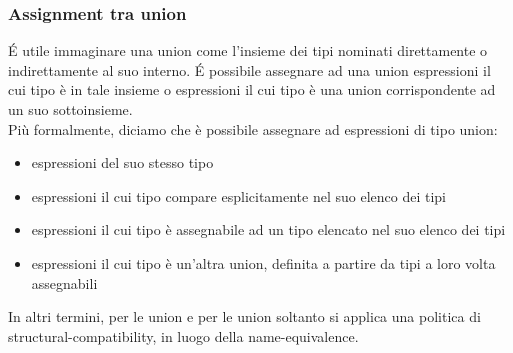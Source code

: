 \subsubsection{Assignment tra union}
É utile immaginare una union come l'insieme dei tipi nominati direttamente
o indirettamente al suo interno. É possibile assegnare ad una union espressioni il cui tipo è
in tale insieme o espressioni il cui tipo è una union corrispondente ad un suo sottoinsieme. \\

Più formalmente, diciamo che è possibile assegnare ad espressioni di tipo union:
\begin{itemize}
    \item espressioni del suo stesso tipo
    \item espressioni il cui tipo compare esplicitamente nel suo elenco dei tipi
    \item espressioni il cui tipo è assegnabile ad un tipo elencato nel suo elenco dei tipi
    \item espressioni il cui tipo è un’altra union, definita a partire da tipi a loro volta assegnabili
\end{itemize} 

\vspace{0.4cm}

In altri termini, per le union e per le union soltanto si applica una politica di structural-compatibility,
in luogo della name-equivalence.
\vspace{0.4cm}